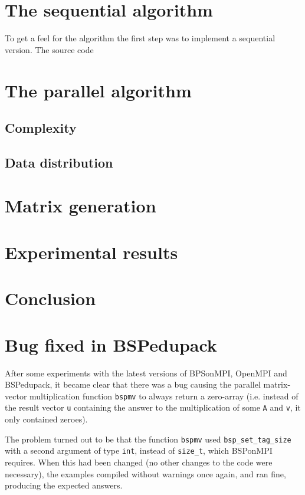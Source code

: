 \documentclass[a4paper]{article}
\begin{document}
\section{The sequential algorithm}

To get a feel for the algorithm the first step was to implement a sequential version. The source code 

\section{The parallel algorithm}

\subsection{Complexity}

\subsection{Data distribution}

\section{Matrix generation}


\section{Experimental results}


\section{Conclusion}


\appendix

\section{Bug fixed in BSPedupack}

After some experiments with the latest versions of BPSonMPI, OpenMPI and
BSPedupack, it became clear that there was a bug causing the parallel matrix-vector
multiplication function
\texttt{bspmv} to always return a zero-array (i.e. instead of the result vector \texttt{u} containing the answer to the multiplication of some \texttt{A} and \texttt{v}, it only contained zeroes).

The problem turned out to be that the function \texttt{bspmv} used \texttt{bsp\_set\_tag\_size} with a second argument of type \texttt{int}, instead of \texttt{size\_t}, which BSPonMPI requires. When this had been changed (no other changes to the code were necessary), the examples compiled without warnings once again, and ran fine, producing the expected answers.
\end{document}
